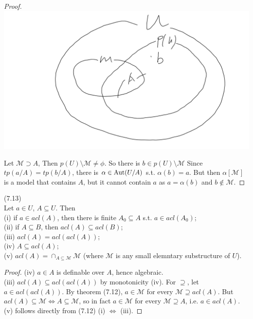 \documentclass[a4paper]{article}
\begin{document}
\begin{thm}
\begin{proof}
        \includegraphics[scale=0.5]{image/Model_12.png}

        Let $\mathcal{M} \supset A$, Then $p(U) \setminus \mathcal{M} \neq \phi$. So there is $b \in p(U) \setminus \mathcal{M}$ Since $tp(a/A) = tp(b/A)$, there is $\alpha \in \operatorname{Aut}(U/A)$ s.t. $\alpha(b) = a$. But then $\alpha[\mathcal{M}]$ is a model that contains $A$, but it cannot contain $a$ as $a = \alpha(b)$ and $b \not\in \mathcal{M}$.
    \end{proof}
\end{thm}

\begin{prop} (7.13)\\
    Let $a \in U$, $A \subseteq U$. Then \\
    (i) if $a \in acl(A)$, then there is finite $A_0 \subseteq A$ s.t. $a \in acl(A_0)$;\\
    (ii) if $A \subseteq B$, then $acl(A) \subseteq acl(B)$;\\
    (iii) $acl(A) = acl(acl(A))$;\\
    (iv) $A \subseteq acl(A)$;\\
    (v) $acl(A) =\cap_{A \subseteq \mathcal{M}} \mathcal{M}$ (where $\mathcal{M}$ is any small elemntary substructure of $U$).
    \begin{proof}
        (iv) $a \in A$ is definable over $A$, hence algebraic.\\
        (iii) $acl(A) \subseteq acl(acl(A))$ by monotonicity (iv). For $\supseteq$, let $a \in acl(acl(A))$. By theorem (7.12), $a \in \mathcal{M}$ for every $\mathcal{M} \supseteq acl(A)$. But $acl(A) \subseteq \mathcal{M} \iff A \subseteq \mathcal{M}$, so in fact $a \in \mathcal{M}$ for every $\mathcal{M} \supseteq A$, i.e. $a \in acl(A)$.\\
        (v) follows directly from (7.12) (i) $\iff$ (iii).
    \end{proof}
\end{prop}
\end{document}
